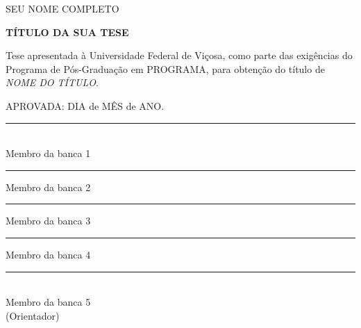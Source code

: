 \newpage
 \thispagestyle{empty}
 \setcounter{page}{1}
\begin{spacing}{1}
\begin{center}
{\MakeUppercase{Seu Nome Completo} \\ }

\vspace*{4.2cm}
{\MakeUppercase{\textbf{Título da sua tese}} \\ }
\end{center}

\vspace*{2.6cm}
\singlespacing
\begin{flushright}
\begin{minipage}{7.5cm}
{Tese apresentada à Universidade Federal de Viçosa, como parte
  das exigências do Programa de Pós-Graduação em PROGRAMA, para
  obtenção do título de \textit{NOME DO TÍTULO}.}
\end{minipage}
\end{flushright}
\vspace*{1.3cm}
%
%
APROVADA: DIA de MÊS de ANO.
\vfill
%
%
\begin{minipage}{0.45\linewidth}
\centering
\vspace{0.5cm}
\rule{\linewidth}{0.1mm}\\
{Membro da banca 1}%
\end{minipage}
\hfill
\begin{minipage}{0.45\linewidth}
\centering
\vspace*{0.5cm}
\rule{\linewidth}{0.1mm}
{Membro da banca 2}%
\end{minipage}
\vfill
\begin{minipage}{0.45\linewidth}
\centering
\rule{\linewidth}{0.1mm}
{Membro da banca 3}%
\end{minipage}
\hfill
\begin{minipage}{0.45\linewidth}
\centering
\rule{\linewidth}{0.1mm}
{Membro da banca 4}%
\end{minipage}

\vfill
\begin{center}
\begin{minipage}{7.5cm}
{\begin{center}
\rule{\linewidth}{0.1mm} \\
{Membro da banca 5}\\%
(Orientador)
\end{center}}
\end{minipage}
\end{center}
\end{spacing}
